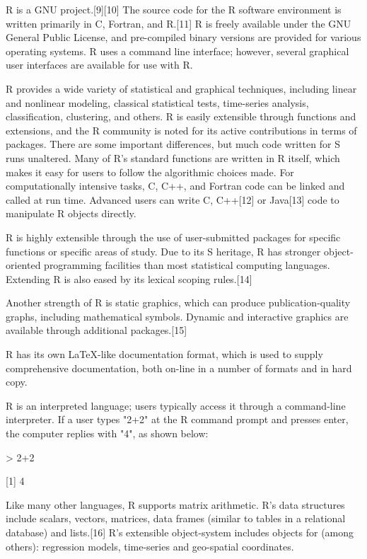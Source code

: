 \vpara
R is a GNU project.[9][10] The source code for the R software environment is written primarily in C, Fortran, and R.[11] R is freely available under the GNU General Public License, and pre-compiled binary versions are provided for various operating systems. R uses a command line interface; however, several graphical user interfaces are available for use with R.

\vpara
R provides a wide variety of statistical and graphical techniques, including linear and nonlinear modeling, classical statistical tests, time-series analysis, classification, clustering, and others. R is easily extensible through functions and extensions, and the R community is noted for its active contributions in terms of packages. There are some important differences, but much code written for S runs unaltered. Many of R's standard functions are written in R itself, which makes it easy for users to follow the algorithmic choices made. For computationally intensive tasks, C, C++, and Fortran code can be linked and called at run time. Advanced users can write C, C++[12] or Java[13] code to manipulate R objects directly.

\vpara
R is highly extensible through the use of user-submitted packages for specific functions or specific areas of study. Due to its S heritage, R has stronger object-oriented programming facilities than most statistical computing languages. Extending R is also eased by its lexical scoping rules.[14]

\vpara
Another strength of R is static graphics, which can produce publication-quality graphs, including mathematical symbols. Dynamic and interactive graphics are available through additional packages.[15]

\vpara
R has its own LaTeX-like documentation format, which is used to supply comprehensive documentation, both on-line in a number of formats and in hard copy.

\vpara
R is an interpreted language; users typically access it through a command-line interpreter. If a user types "2+2" at the R command prompt and presses enter, the computer replies with "4", as shown below:

> 2+2

[1] 4

\vpara
Like many other languages, R supports matrix arithmetic. R's data structures include scalars, vectors, matrices, data frames (similar to tables in a relational database) and lists.[16] R's extensible object-system includes objects for (among others): regression models, time-series and geo-spatial coordinates.

